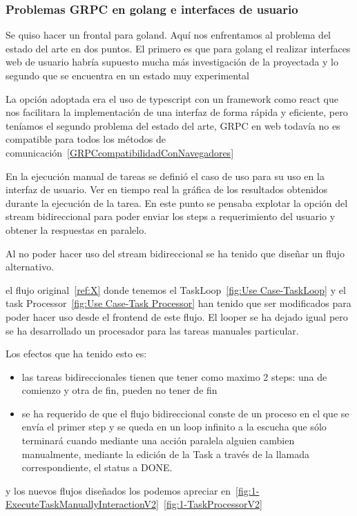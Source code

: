 
\subsubsection{Problemas GRPC en golang e interfaces de usuario}\label{subsubsec:problemas-rpc-en-golang}
Se quiso hacer un frontal para goland.
Aquí nos enfrentamos al problema del estado del arte en dos puntos.
El primero es que para golang el realizar interfaces web de usuario habría supuesto mucha más investigación de la proyectada y lo segundo que se encuentra en un estado muy experimental

La opción adoptada era el uso de typescript con un framework como react que nos facilitara la implementación de una interfaz de forma rápida y eficiente, pero teníamos el segundo problema del estado del arte, GRPC en web todavía no es compatible para todos los métodos de comunicación~\cref{GRPCcompatibilidadConNavegadores}

En la ejecución manual de tareas se definió el caso de uso para su uso en la interfaz de usuario.
Ver en tiempo real la gráfica de los resultados obtenidos durante la ejecución de la tarea.
En este punto se pensaba explotar la opción del stream bidireccional para poder enviar los steps a requerimiento del usuario y obtener la respuestas en paralelo.

Al no poder hacer uso del stream bidireccional se ha tenido que diseñar un flujo alternativo.

el flujo original~\cref{ref:X} donde tenemos el TaskLoop~\cref{fig:Use Case-TaskLoop} y el task Processor~\cref{fig:Use Case-Task Processor} han tenido que ser modificados para poder hacer uso desde el frontend de este flujo.
El looper se ha dejado igual pero se ha desarrollado un procesador para las tareas manuales particular.

Los efectos que ha tenido esto es:
\begin{itemize}
    \item las tareas bidireccionales tienen que tener como maximo 2 steps: una de comienzo y otra de fin, pueden no tener de fin
    \item se ha requerido de que el flujo bidireccional conste de un proceso en el que se envía el primer step y se queda en un loop infinito a la escucha que sólo terminará cuando mediante una acción paralela alguien cambien manualmente, mediante la edición de la Task a través de la llamada correspondiente, el status a DONE\@.
\end{itemize}

y los nuevos flujos diseñados los podemos apreciar en~\cref{fig:1-ExecuteTaskManuallyInteractionV2}~\cref{fig:1-TaskProcessorV2}

